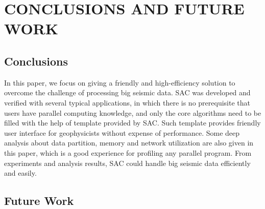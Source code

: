 %
%
%



\chapter{\uppercase{Conclusions and Future Work}}

\section{Conclusions}

In this paper, we focus on giving a friendly and high-efficiency solution to overcome the challenge of processing big seismic data. SAC was developed and verified with several typical applications, in which there is no prerequisite that users have parallel computing knowledge, and only the core algorithms need to be filled with the help of template provided by SAC. Such template provides friendly user interface for geophysicists without expense of performance. Some deep analysis about data partition, memory and network utilization are also given in this paper, which is a good experience for profiling any parallel program. From experiments and analysis results, SAC could handle big seismic data efficiently and easily. 

\section{Future Work}

